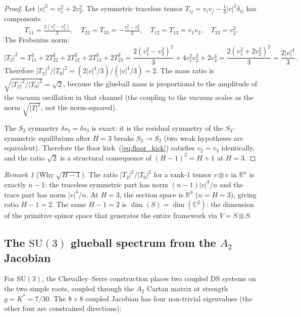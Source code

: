 \documentclass[11pt,a4paper]{article}
\theoremstyle{definition}
\theoremstyle{remark}
\newtheorem{remark}[theorem]{Remark}
\newcommand{\C}{\mathbb{C}}
\newcommand{\R}{\mathbb{R}}
\newcommand{\SU}{\mathrm{SU}}
\begin{document}
\begin{proof}
Let $|v|^2=v_1^2+2v_2^2$. The symmetric traceless tensor $T_{ij}=v_iv_j-\tfrac{1}{3}|v|^2\delta_{ij}$ has components
\[
T_{11}=\tfrac{2(v_1^2-v_2^2)}{3},\quad T_{22}=T_{33}=-\tfrac{v_1^2-v_2^2}{3},\quad T_{12}=T_{13}=v_1v_2,\quad T_{23}=v_2^2.
\]
The Frobenius norm:
\[
|T_2|^2 = T_{11}^2+2T_{22}^2+2T_{12}^2+2T_{13}^2+2T_{23}^2 = \frac{2(v_1^2-v_2^2)^2}{3}+4v_1^2v_2^2+2v_2^4 = \frac{2(v_1^2+2v_2^2)^2}{3} = \frac{2|v|^4}{3}.
\]
Therefore $|T_2|^2/|T_0|^2=(2|v|^4/3)/(|v|^4/3)=2$. The mass ratio is $\sqrt{|T_2|^2/|T_0|^2}=\sqrt{2}$, because the glueball mass is proportional to the amplitude of the vacuum oscillation in that channel (the coupling to the vacuum scales as the norm $\sqrt{|T|^2}$, not the norm-squared).

The $S_2$ symmetry $\delta s_2=\delta s_3$ is exact: it is the residual symmetry of the $S_3$-symmetric equilibrium after $H=3$ breaks $S_3\to S_2$ (two weak hypotheses are equivalent). Therefore the floor kick~(\ref{eq:floor_kick}) satisfies $v_2=v_3$ identically, and the ratio $\sqrt{2}$ is a structural consequence of $(H-1)^2=H+1$ at $H=3$.
\end{proof}

\begin{remark}[Why $\sqrt{H-1}$]\label{rem:sqrt_H_minus_1}
The ratio $|T_2|^2/|T_0|^2$ for a rank-$1$ tensor $v\otimes v$ in $\R^n$ is exactly $n-1$: the traceless symmetric part has norm $(n-1)|v|^4/n$ and the trace part has norm $|v|^4/n$. At $H=3$, the section space is $\R^3$ ($n=H=3$), giving ratio $H-1=2$. The same $H-1=2$ is $\dim(S)=\dim(\C^2)$: the dimension of the primitive spinor space that generates the entire framework via $V=S\otimes S$.
\end{remark}

\subsection{The $\SU(3)$ glueball spectrum from the $A_2$ Jacobian}

For $\SU(3)$, the Chevalley--Serre construction places two coupled DS systems on the two simple roots, coupled through the $A_2$ Cartan matrix at strength $g=K^*=7/30$. The $8\times 8$ coupled Jacobian has four non-trivial eigenvalues (the other four are constrained directions):
\end{document}
